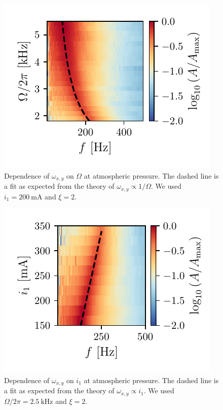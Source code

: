\begin{figure}
    \includegraphics{figures/data/xy_mode_dependence_on_driving_frequency.pdf}
    \caption{Dependence of $\omega_{x,y}$ on $\Omega$ at atmospheric pressure. The dashed line is a fit as expected from the theory of $\omega_{x,y} \propto 1/\Omega$. We used $i_1 = \qty{200}{\milli\ampere}$ and $\xi = 2$.}
    \label{fig:xy-mode-dependence-driving-frequency-1bar}
\end{figure}
\begin{figure}
    \includegraphics{figures/data/xy_mode_dependence_on_inner_current.pdf}
    \caption{Dependence of $\omega_{x,y}$ on $i_1$ at atmospheric pressure. The dashed line is a fit as expected from the theory of $\omega_{x,y} \propto i_1$. We used $\Omega/2\pi = \qty{2.5}{\kilo\hertz}$ and $\xi = 2$.}
    \label{fig:xy-mode-dependence-inner-current-1bar}
\end{figure}
